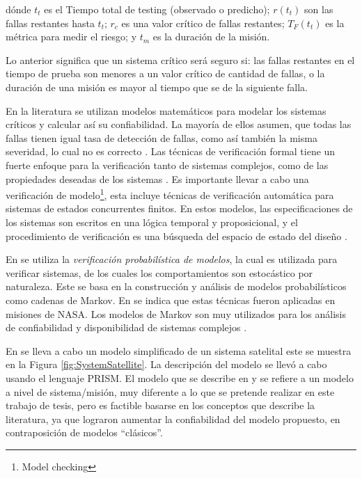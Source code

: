   dónde $t_t$ es el Tiempo total de testing (observado o predicho); $r(t_t)$ son las fallas restantes hasta $t_t$; $r_c$ es una valor crítico de fallas restantes; $T_F(t_t)$ es la métrica para medir el riesgo; y $t_m$ es la duración de la misión.

  Lo anterior significa que un sistema crítico será seguro si: las fallas restantes en el tiempo de prueba son menores a un valor crítico de cantidad de fallas, o la duración de una misión es mayor al tiempo que se de la siguiente falla.
  
  En la literatura se utilizan modelos matemáticos para modelar los sistemas críticos y calcular así su confiabilidad. La mayoría de ellos asumen, que todas las fallas tienen igual tasa de detección de fallas, como así también la misma severidad, lo cual no es correcto \citep{Liu14}. Las técnicas de verificación formal tiene un fuerte enfoque para la verificación tanto de sistemas complejos, como de las propiedades deseadas de los sistemas \citep{Peng13}. Es importante llevar a cabo una verificación de modelo\footnote{Model checking}, esta incluye técnicas de verificación automática para sistemas de estados concurrentes finitos. En estos modelos, las especificaciones de los sistemas son escritos en una lógica temporal y proposicional, y el procedimiento de verificación es una búsqueda del espacio de estado del diseño \citep{Hoque15}.

  En \cite{Hoque15} se utiliza la \textit{verificación probabilística de modelos}, la cual es utilizada para verificar sistemas, de los cuales los comportamientos son estocástico por naturaleza. Este se basa en la construcción y análisis de modelos probabilísticos como cadenas de Markov. En \cite{Hoque15} se indica que estas técnicas fueron aplicadas en misiones de \ac{NASA}. Los modelos de Markov son muy utilizados para los análisis de confiabilidad y disponibilidad de sistemas complejos \citep{Hoque15}.

  En \cite{Hoque15} se lleva a cabo un modelo simplificado de un sistema satelital este se muestra en la Figura \ref{fig:SystemSatellite}. La descripción del modelo se llevó a cabo usando el lenguaje PRISM. El modelo que se describe en \cite{Hoque15} y \cite{Peng13} se refiere a un modelo a nivel de sistema/misión, muy diferente a lo que se pretende realizar en este trabajo de tesis, pero es factible basarse en los conceptos que describe la literatura, ya que lograron aumentar la confiabilidad del modelo propuesto, en contraposición de modelos ``clásicos''.

